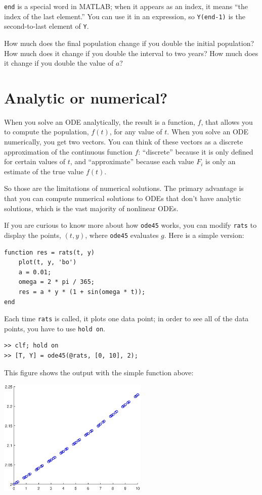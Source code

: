 \documentclass{book}
\begin{document}
{\tt end} is a special word in MATLAB; when it appears as an index,
it means ``the index of the last element.''  You can use it in an
expression, so {\tt Y(end-1)} is the second-to-last element of
{\tt Y}.

How much does the final population change if you double the initial
population?  How much does it change if you double the interval
to two years?  How much does it change if you double the value
of $a$?


\section{Analytic or numerical?}

When you solve an ODE analytically, the result is a function, $f$,
that allows you to compute the population, $f(t)$, for any value of
$t$.  When you solve an ODE numerically, you get two vectors.  You can
think of these vectors as a discrete approximation of the continuous
function $f$: ``discrete'' because it is only defined for certain
values of $t$, and ``approximate'' because each value $F_i$
is only an estimate of the true value $f(t)$.

So those are the limitations of numerical solutions.  The primary
advantage is that you can compute numerical solutions to ODEs that
don't have analytic solutions, which is the vast majority
of nonlinear ODEs.

If you are curious to know more about how {\tt ode45} works, you
can modify {\tt rats} to display the points, $(t, y)$, where
{\tt ode45} evaluates $g$.  Here is a simple version:

\begin{verbatim}
function res = rats(t, y)
    plot(t, y, 'bo')
    a = 0.01;
    omega = 2 * pi / 365;
    res = a * y * (1 + sin(omega * t));
end
\end{verbatim}

Each time {\tt rats} is called, it plots one data point; in order
to see all of the data points, you have to use {\tt hold on}.

\begin{verbatim}
>> clf; hold on
>> [T, Y] = ode45(@rats, [0, 10], 2);
\end{verbatim}
This figure shows the output with the simple function above:

\beforefig \centerline{\includegraphics[height=2.2in]{figs/ode45_simple.eps}}
\end{document}
